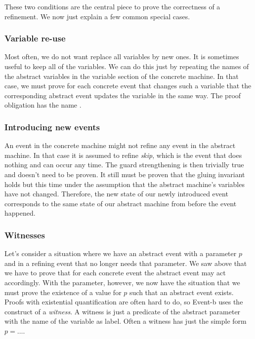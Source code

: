 These two conditions are the central piece to prove the correctness of a refinement. We now just explain a few
common special cases.

\subsubsection{Variable re-use}
\label{tut_variable_reuse}
Most often, we do not want replace all variables by new ones. It is sometimes useful to keep all of the variables.
We can do this just by repeating the names of the abstract variables in the variable section of the concrete
machine. In that case, we must prove for each concrete event that changes such a variable that the corresponding 
abstract event updates the variable in the same way.
The proof obligation has the name .

\subsubsection{Introducing new events}
\label{tut_skip}
An event in the concrete machine might not refine any event in the abstract machine. In that case it is assumed
to refine \emph{skip}, which is the event that does nothing and can occur any time. 
The guard strengthening is then trivially true and doesn't need to be proven.
It still must be proven that the gluing invariant holds but this time under the assumption that the abstract machine's
variables have not changed. Therefore, the new state of our newly introduced event corresponds to the same state of
our abstract machine from before the event happened.

\subsubsection{Witnesses}
\label{tut_witnesses}
Let's consider a situation where we have an abstract event with a parameter $p$ and in a refining event that no longer needs that parameter.
We saw above that we have to prove that for each concrete event the abstract event may act accordingly.
With the parameter, however, we now have the situation that we must prove the existence of a value for $p$ such
that an abstract event exists. Proofs with existential quantification are often hard to do, so Event-b 
uses the construct of a \emph{witness}. A witness is just a predicate of the abstract parameter with the
name of the variable as label. Often a witness has just the simple form $p = \ldots$.


